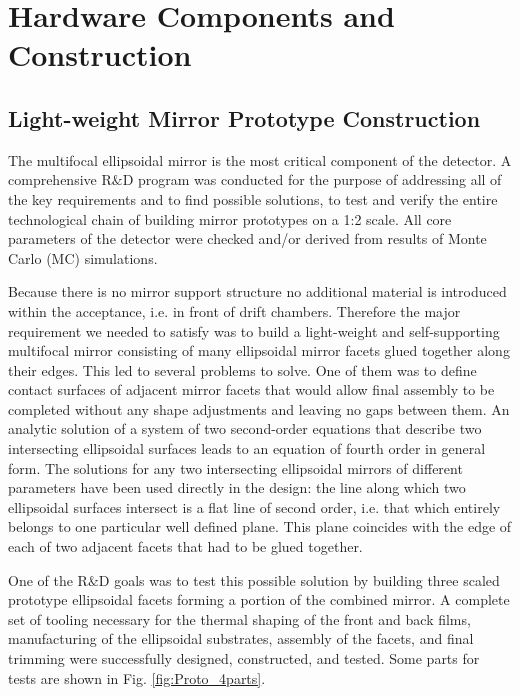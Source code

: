 \section{Hardware Components and Construction}
\subsection{Light-weight Mirror Prototype Construction}
The multifocal ellipsoidal mirror is the most critical component of the detector. A comprehensive R$\&$D program was conducted for the purpose of addressing all of the key requirements and to find possible solutions, to test and verify the entire technological chain of building mirror prototypes on a 1:2 scale. All core parameters of the detector were checked and/or derived from results of Monte Carlo (MC) simulations.

Because there is no mirror support structure no additional material is introduced  within the acceptance, i.e. in front of drift chambers. Therefore the major requirement we needed to satisfy was to build a light-weight and self-supporting multifocal mirror consisting of many ellipsoidal mirror facets glued together along their edges. This led to several problems to solve. One of them was to define contact surfaces of adjacent mirror facets that would allow final assembly to be completed without any shape adjustments and leaving no gaps between them. An analytic solution of a system of two second-order equations that describe two intersecting ellipsoidal surfaces leads to an equation of fourth order in general form. The solutions for any two intersecting ellipsoidal mirrors of different parameters have been used directly in the design: the line along which two ellipsoidal surfaces intersect is a flat line of second order, i.e. that which entirely belongs to one particular well defined plane. This plane coincides with the edge of each of two adjacent facets that had to be glued together.

One of the R$\&$D goals was to test this possible solution by building three scaled prototype ellipsoidal facets forming a portion of the combined mirror. A complete set of tooling necessary for the thermal shaping of the front and back films, manufacturing of the ellipsoidal substrates, assembly of the facets, and final trimming were successfully designed, constructed, and tested. Some parts for tests are shown in Fig. \ref{fig:Proto_4parts}.

